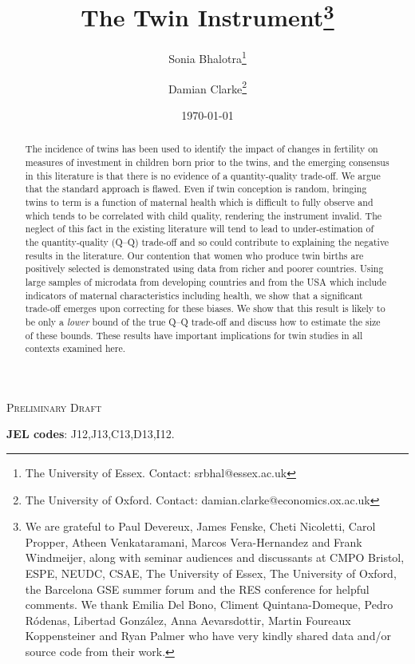 \documentclass[subeqn]{article}
\title{The Twin Instrument\footnote{We are grateful to Paul Devereux, James 
Fenske, Cheti Nicoletti, Carol Propper, Atheen Venkataramani, Marcos 
Vera-Hernandez and Frank Windmeijer, along with seminar audiences and discussants 
at CMPO Bristol, ESPE, NEUDC, CSAE, The University of Essex, The University of 
Oxford, the Barcelona GSE summer forum and the RES conference for helpful 
comments.  We thank Emilia Del Bono, Climent Quintana-Domeque, Pedro R\'odenas, 
Libertad Gonz\'alez, Anna Aevarsdottir, Martin Foureaux Koppensteiner and Ryan 
Palmer who have very kindly shared data and/or source code from their work.}}
\author{Sonia Bhalotra\thanks{The University of Essex.
Contact: srbhal@essex.ac.uk} 
\and Damian Clarke\thanks{The University of Oxford. 
Contact: damian.clarke@economics.ox.ac.uk}}
\date{\today}
\begin{document}
\begin{spacing}{1.4}

\maketitle
\vspace{-1cm}
\begin{center}{\Large\textsc{Preliminary Draft}}\end{center}
\begin{abstract}
 The incidence of twins has been used to identify the impact of changes in 
 fertility on measures of investment in children born prior to the twins, and
 the emerging consensus in this literature is that there is no evidence of a
 quantity-quality trade-off. We argue that the standard approach is flawed.
 Even if twin conception is random, bringing twins to term is a function of
 maternal health which is difficult to fully observe and which tends to be
 correlated with child quality, rendering the instrument invalid. The neglect
 of this fact in the existing literature will tend to lead to under-estimation 
 of the quantity-quality (Q--Q) trade-off and so could contribute to explaining 
 the negative results in the literature. Our contention that women who produce 
 twin births are positively selected is demonstrated using data from richer and 
 poorer countries. Using large samples of microdata from developing countries 
 and from the USA which include indicators of maternal characteristics including
 health, we show that a significant trade-off emerges upon correcting for these
 biases. We show that this result is likely to be only a \emph{lower} bound of
 the true Q--Q trade-off and discuss how to estimate the size of these bounds.
 These results have important implications for twin studies in all contexts
 examined here.
\\
\end{abstract}
\hspace{4mm}\textbf{\small JEL codes}: J12,J13,C13,D13,I12. \\

\newpage

\end{spacing}
\end{document}
